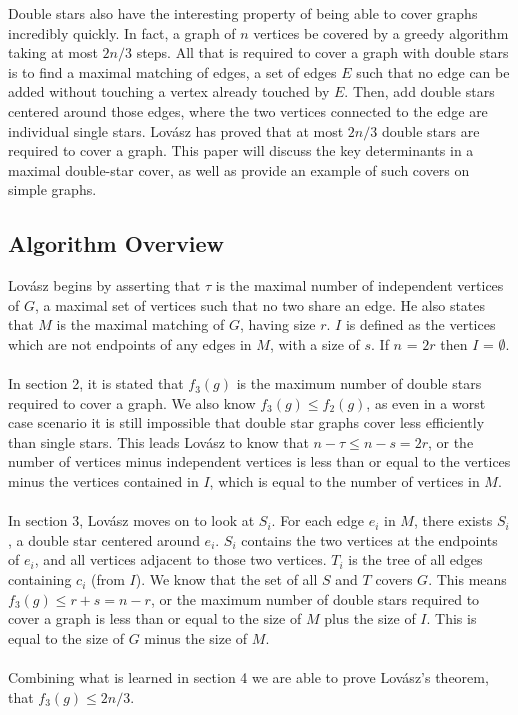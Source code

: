 \documentclass{article}
\begin{document}
	Double stars also have the interesting property of being able to cover graphs incredibly quickly. In fact, a graph of $n$ vertices be covered by a greedy algorithm taking at most $2n/3$ steps. All that is required to cover a graph with double stars is to find a maximal matching of edges, a set of edges $E$ such that no edge can be added without touching a vertex already touched by $E$. Then, add double stars centered around those edges, where the two vertices connected to the edge are individual single stars. Lov\'asz has proved that at most $2n/3$ double stars are required to cover a graph. This paper will discuss the key determinants in a maximal double-star cover, as well as provide an example of such covers on simple graphs.
	\subsection{Algorithm Overview}
	
	Lov\'asz begins by asserting that $\tau$ is the maximal number of independent vertices of $G$, a maximal set of vertices such that no two share an edge. He also states that $M$ is the maximal matching of $G$, having size $r$. $I$ is defined as the vertices which are not endpoints of any edges in $M$, with a size of $s$. If $n$ = $2r$ then $I$ = $\emptyset$.
	\\\\
	In section 2, it is stated that $f_{3}(g)$ is the maximum number of double stars required to cover a graph. We also know $f_{3}(g) \leq f_{2}(g)$, as even in a worst case scenario it is still impossible that double star graphs cover less efficiently than single stars. This leads Lov\'asz to know that $n-\tau \leq n-s = 2r$, or the number of vertices minus independent vertices is less than or equal to the vertices minus the vertices contained in $I$, which is equal to the number of vertices in $M$.
	\\\\
	In section 3, Lov\'asz moves on to look at $S_{i}$. For each edge $e_{i}$ in $M$, there exists $S_{i}$, a double star centered around $e_{i}$. $S_{i}$ contains the two vertices at the endpoints of $e_{i}$, and all vertices adjacent to those two vertices. $T_{i}$ is the tree of all edges containing $c_{i}$ (from $I$). We know that the set of all $S$ and $T$ covers $G$. This means $f_{3}(g) \leq r + s = n - r$, or the maximum number of double stars required to cover a graph is less than or equal to the size of $M$ plus the size of $I$. This is equal to the size of $G$ minus the size of $M$.
	\\\\
	Combining what is learned in section 4 we are able to prove Lov\'asz's theorem, that $f_{3}(g) \leq 2n/3$.
	
\end{document}
